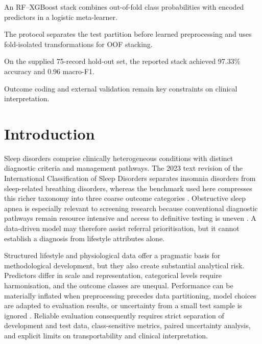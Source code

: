 \documentclass[a4paper,fleqn]{cas-dc}
\begin{document}
\begin{highlights}
\item An RF--XGBoost stack combines out-of-fold class probabilities with encoded predictors in a logistic meta-learner.
\item The protocol separates the test partition before learned preprocessing and uses fold-isolated transformations for OOF stacking.
\item On the supplied 75-record hold-out set, the reported stack achieved 97.33\% accuracy and 0.96 macro-F1.
\item Outcome coding and external validation remain key constraints on clinical interpretation.
\end{highlights}

\maketitle

\section{Introduction}
Sleep disorders comprise clinically heterogeneous conditions with distinct diagnostic criteria and management pathways. The 2023 text revision of the International Classification of Sleep Disorders separates insomnia disorders from sleep-related breathing disorders, whereas the benchmark used here compresses this richer taxonomy into three coarse outcome categories \cite{aasm2023}. Obstructive sleep apnea is especially relevant to screening research because conventional diagnostic pathways remain resource intensive and access to definitive testing is uneven \cite{korkalainen2024,giorgi2025,bazoukis2023}. A data-driven model may therefore assist referral prioritisation, but it cannot establish a diagnosis from lifestyle attributes alone.

Structured lifestyle and physiological data offer a pragmatic basis for methodological development, but they also create substantial analytical risk. Predictors differ in scale and representation, categorical levels require harmonisation, and the outcome classes are unequal. Performance can be materially inflated when preprocessing precedes data partitioning, model choices are adapted to evaluation results, or uncertainty from a small test sample is ignored \cite{kapoor2023,efthimiou2024,collins2024}. Reliable evaluation consequently requires strict separation of development and test data, class-sensitive metrics, paired uncertainty analysis, and explicit limits on transportability and clinical interpretation.
\end{document}
